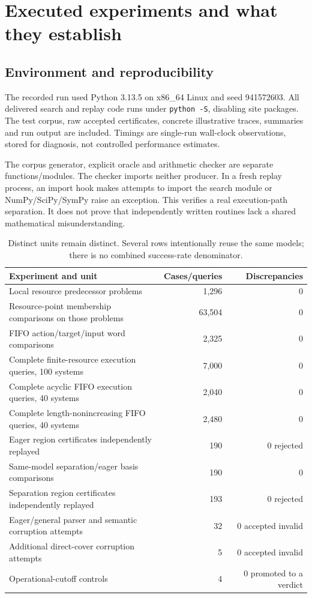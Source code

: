 \documentclass[11pt,a4paper]{article}
\theoremstyle{definition}
\newcommand{\code}[1]{\texttt{#1}}
\begin{document}
\section{Executed experiments and what they establish}
\label{sec:experiments}

\subsection{Environment and reproducibility}
The recorded run used Python 3.13.5 on x86\_64 Linux and seed 941572603.
All delivered search and replay code runs under \code{python -S}, disabling
site packages. The test corpus, raw accepted certificates, concrete
illustrative traces, summaries and run output are included. Timings are
single-run wall-clock observations, stored for diagnosis, not controlled
performance estimates.

The corpus generator, explicit oracle and arithmetic checker are separate
functions/modules. The checker imports neither producer. In a fresh replay
process, an import hook makes attempts to import the search module or
NumPy/SciPy/SymPy raise an exception. This verifies a real execution-path
separation. It does not prove that independently written routines lack a
shared mathematical misunderstanding.

\begin{table}[htbp]
\centering\small
\begin{tabularx}{\textwidth}{@{}Xrr@{}}
\toprule
Experiment and unit & Cases/queries & Discrepancies\\
\midrule
Local resource predecessor problems & 1,296 & 0\\
Resource-point membership comparisons on those problems & 63,504 & 0\\
FIFO action/target/input word comparisons & 2,325 & 0\\
Complete finite-resource execution queries, 100 systems & 7,000 & 0\\
Complete acyclic FIFO execution queries, 40 systems & 2,040 & 0\\
Complete length-nonincreasing FIFO queries, 40 systems & 2,480 & 0\\
Eager region certificates independently replayed & 190 & 0 rejected\\
Same-model separation/eager basis comparisons & 190 & 0\\
Separation region certificates independently replayed & 193 & 0 rejected\\
Eager/general parser and semantic corruption attempts & 32 & 0 accepted invalid\\
Additional direct-cover corruption attempts & 5 & 0 accepted invalid\\
Operational-cutoff controls & 4 & 0 promoted to a verdict\\
\bottomrule
\end{tabularx}
\caption{Distinct units remain distinct. Several rows intentionally reuse the same models; there is no combined success-rate denominator.}
\label{tab:tests}
\end{table}
\end{document}
